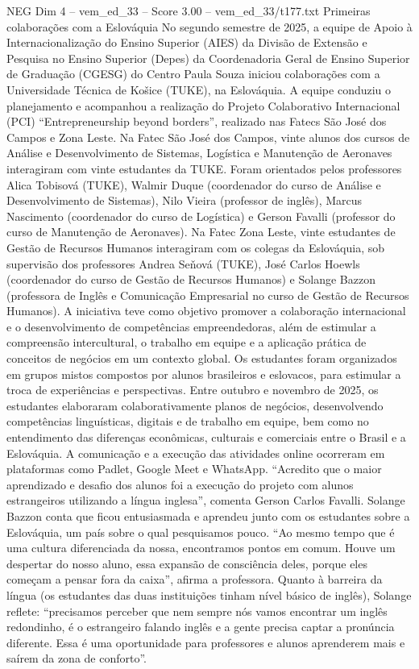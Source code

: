 \begin{textsample}{NEG Dim 4 – vem\_ed\_33 – Score 3.00 – vem\_ed\_33/t177.txt}  \label{ex:f4_neg_042}
Primeiras colaborações com a Eslováquia No segundo semestre de 2025, a equipe de Apoio à Internacionalização do Ensino Superior (AIES) da Divisão de Extensão e Pesquisa no Ensino Superior (Depes) da Coordenadoria Geral de Ensino Superior de Graduação (CGESG) do Centro Paula Souza iniciou colaborações com a Universidade Técnica de Košice (TUKE), na Eslováquia.
A equipe conduziu o planejamento e acompanhou a realização do Projeto Colaborativo Internacional (PCI) “Entrepreneurship beyond borders”, realizado nas Fatecs São José dos Campos e Zona Leste.
Na Fatec São José dos Campos, vinte alunos dos cursos de Análise e Desenvolvimento de Sistemas, Logística e Manutenção de Aeronaves interagiram com vinte estudantes da TUKE.
Foram orientados pelos professores Alica Tobisová (TUKE), Walmir Duque (coordenador do curso de Análise e Desenvolvimento de Sistemas), Nilo Vieira (professor de inglês), Marcus Nascimento (coordenador do curso de Logística) e Gerson Favalli (professor do curso de Manutenção de Aeronaves).
Na Fatec Zona Leste, vinte estudantes de Gestão de Recursos Humanos interagiram com os colegas da Eslováquia, sob supervisão dos professores Andrea Seňová (TUKE), José Carlos Hoewls (coordenador do curso de Gestão de Recursos Humanos) e Solange Bazzon (professora de Inglês e Comunicação Empresarial no curso de Gestão de Recursos Humanos).
A iniciativa teve como objetivo promover a colaboração internacional e o desenvolvimento de competências empreendedoras, além de estimular a compreensão intercultural, o trabalho em equipe e a aplicação prática de conceitos de negócios em um contexto global.
Os estudantes foram organizados em grupos mistos compostos por alunos brasileiros e eslovacos, para estimular a troca de experiências e perspectivas.
Entre outubro e novembro de 2025, os estudantes elaboraram colaborativamente planos de negócios, desenvolvendo competências linguísticas, digitais e de trabalho em equipe, bem como no entendimento das diferenças econômicas, culturais e comerciais entre o Brasil e a Eslováquia.
A comunicação e a execução das atividades online ocorreram em plataformas como Padlet, Google Meet e WhatsApp. “Acredito que o maior aprendizado e desafio dos alunos foi a execução do projeto com alunos estrangeiros utilizando a língua inglesa”, comenta Gerson Carlos Favalli.
Solange Bazzon conta que ficou entusiasmada e aprendeu junto com os estudantes sobre a Eslováquia, um país sobre o qual pesquisamos pouco. “Ao mesmo tempo que é uma cultura diferenciada da nossa, encontramos pontos em comum.
Houve um despertar do nosso aluno, essa expansão de consciência deles, porque eles começam a pensar fora da caixa”, afirma a professora.
Quanto à barreira da língua (os estudantes das duas instituições tinham nível básico de inglês), Solange reflete: “precisamos perceber que nem sempre nós vamos encontrar um inglês redondinho, é o estrangeiro falando inglês e a gente precisa captar a pronúncia diferente.
Essa é uma oportunidade para professores e alunos aprenderem mais e saírem da zona de conforto”.

\end{textsample}
